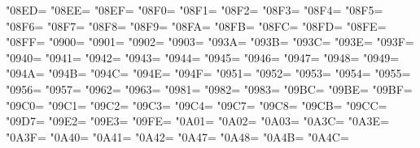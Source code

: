 \XeTeXcharclass"08ED=\KclassCM
\XeTeXcharclass"08EE=\KclassCM
\XeTeXcharclass"08EF=\KclassCM
\XeTeXcharclass"08F0=\KclassCM
\XeTeXcharclass"08F1=\KclassCM
\XeTeXcharclass"08F2=\KclassCM
\XeTeXcharclass"08F3=\KclassCM
\XeTeXcharclass"08F4=\KclassCM
\XeTeXcharclass"08F5=\KclassCM
\XeTeXcharclass"08F6=\KclassCM
\XeTeXcharclass"08F7=\KclassCM
\XeTeXcharclass"08F8=\KclassCM
\XeTeXcharclass"08F9=\KclassCM
\XeTeXcharclass"08FA=\KclassCM
\XeTeXcharclass"08FB=\KclassCM
\XeTeXcharclass"08FC=\KclassCM
\XeTeXcharclass"08FD=\KclassCM
\XeTeXcharclass"08FE=\KclassCM
\XeTeXcharclass"08FF=\KclassCM
\XeTeXcharclass"0900=\KclassCM
\XeTeXcharclass"0901=\KclassCM
\XeTeXcharclass"0902=\KclassCM
\XeTeXcharclass"0903=\KclassCM
\XeTeXcharclass"093A=\KclassCM
\XeTeXcharclass"093B=\KclassCM
\XeTeXcharclass"093C=\KclassCM
\XeTeXcharclass"093E=\KclassCM
\XeTeXcharclass"093F=\KclassCM
\XeTeXcharclass"0940=\KclassCM
\XeTeXcharclass"0941=\KclassCM
\XeTeXcharclass"0942=\KclassCM
\XeTeXcharclass"0943=\KclassCM
\XeTeXcharclass"0944=\KclassCM
\XeTeXcharclass"0945=\KclassCM
\XeTeXcharclass"0946=\KclassCM
\XeTeXcharclass"0947=\KclassCM
\XeTeXcharclass"0948=\KclassCM
\XeTeXcharclass"0949=\KclassCM
\XeTeXcharclass"094A=\KclassCM
\XeTeXcharclass"094B=\KclassCM
\XeTeXcharclass"094C=\KclassCM
\XeTeXcharclass"094E=\KclassCM
\XeTeXcharclass"094F=\KclassCM
\XeTeXcharclass"0951=\KclassCM
\XeTeXcharclass"0952=\KclassCM
\XeTeXcharclass"0953=\KclassCM
\XeTeXcharclass"0954=\KclassCM
\XeTeXcharclass"0955=\KclassCM
\XeTeXcharclass"0956=\KclassCM
\XeTeXcharclass"0957=\KclassCM
\XeTeXcharclass"0962=\KclassCM
\XeTeXcharclass"0963=\KclassCM
\XeTeXcharclass"0981=\KclassCM
\XeTeXcharclass"0982=\KclassCM
\XeTeXcharclass"0983=\KclassCM
\XeTeXcharclass"09BC=\KclassCM
\XeTeXcharclass"09BE=\KclassCM
\XeTeXcharclass"09BF=\KclassCM
\XeTeXcharclass"09C0=\KclassCM
\XeTeXcharclass"09C1=\KclassCM
\XeTeXcharclass"09C2=\KclassCM
\XeTeXcharclass"09C3=\KclassCM
\XeTeXcharclass"09C4=\KclassCM
\XeTeXcharclass"09C7=\KclassCM
\XeTeXcharclass"09C8=\KclassCM
\XeTeXcharclass"09CB=\KclassCM
\XeTeXcharclass"09CC=\KclassCM
\XeTeXcharclass"09D7=\KclassCM
\XeTeXcharclass"09E2=\KclassCM
\XeTeXcharclass"09E3=\KclassCM
\XeTeXcharclass"09FE=\KclassCM
\XeTeXcharclass"0A01=\KclassCM
\XeTeXcharclass"0A02=\KclassCM
\XeTeXcharclass"0A03=\KclassCM
\XeTeXcharclass"0A3C=\KclassCM
\XeTeXcharclass"0A3E=\KclassCM
\XeTeXcharclass"0A3F=\KclassCM
\XeTeXcharclass"0A40=\KclassCM
\XeTeXcharclass"0A41=\KclassCM
\XeTeXcharclass"0A42=\KclassCM
\XeTeXcharclass"0A47=\KclassCM
\XeTeXcharclass"0A48=\KclassCM
\XeTeXcharclass"0A4B=\KclassCM
\XeTeXcharclass"0A4C=\KclassCM
